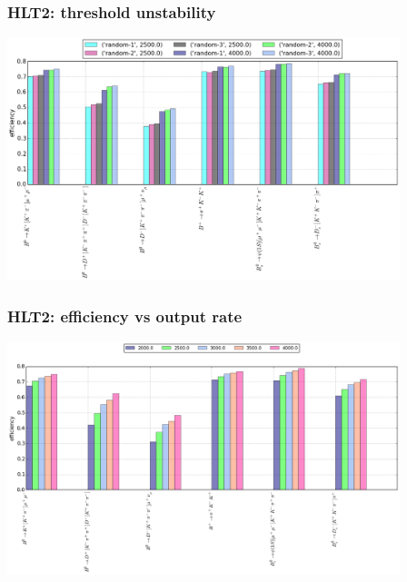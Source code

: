 \documentclass[xcolor=svgnames]{beamer}
\begin{document}
\begin{frame}\frametitle{HLT2: threshold unstability}
\includegraphics[width=4.5in]{images/random.png}
\end{frame}

\begin{frame}\frametitle{HLT2: efficiency vs output rate}
\includegraphics[width=4.5in]{images/rates_small.png}
\end{frame}
\end{document}
